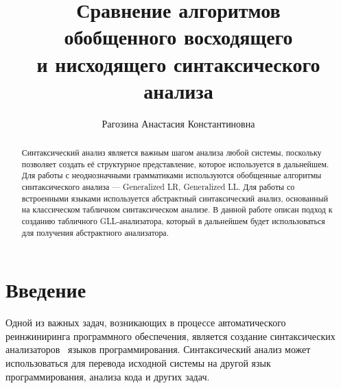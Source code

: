 
\title{Сравнение алгоритмов\\ 
обобщенного восходящего\\
и нисходящего синтаксического анализа}
%

\author{Рагозина Анастасия Константиновна}
%
%
%

\maketitle

\begin{abstract}
Синтаксический анализ является важным шагом анализа любой системы, поскольку позволяет создать её структурное представление, которое используется в дальнейшем. 
Для работы с неоднозначными грамматиками используются обобщенные алгоритмы синтаксического анализа --- Generalized LR, Generalized LL. Для работы со встроенными 
языками используется абстрактный синтаксический анализ, основанный на классическом табличном синтаксическом анализе. В данной работе описан подход к созданию табличного 
GLL-анализатора, который в дальнейшем будет использоваться для получения абстрактного анализатора.
\end{abstract}

\section*{Введение}
Одной из важных задач, возникающих в процессе автоматического реинжиниринга программного обеспечения, является создание синтаксических анализаторов~\cite{ulman} языков программирования. Синтаксический анализ может использоваться для перевода исходной системы на другой язык программирования, анализа кода и других задач.

